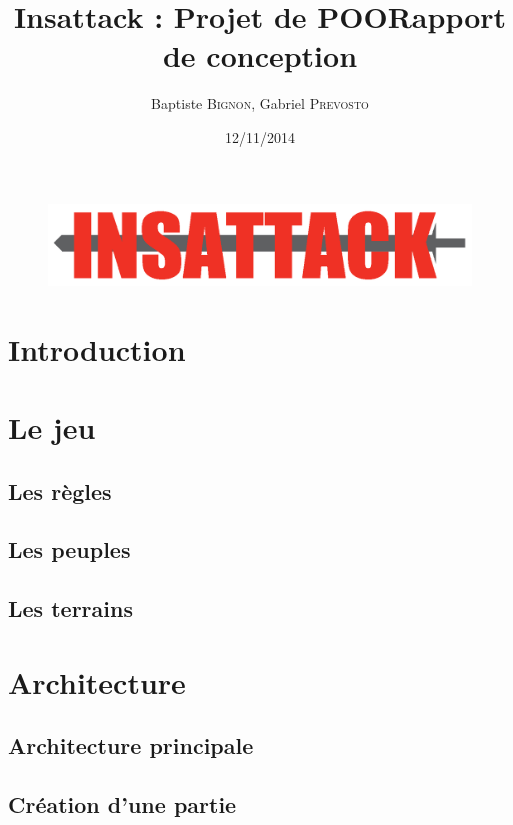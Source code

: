 \documentclass[12pt]{article}
\title{Insattack : Projet de POO\smallbreak Rapport de conception}
\author{Baptiste \textsc{Bignon}, Gabriel \textsc{Prevosto}}
\date{12/11/2014}
\begin{document}
\maketitle

\begin{figure}[!h]
\centering
\includegraphics[width=\textwidth]{Parties/Images/Logo}
\label{fig:logo}
\end{figure}

\newpage

\tableofcontents
\renewcommand{\contentsname}{Sommaire}
\newpage


\section{Introduction}			\label{sec:introduction}
\newpage

\section{Le jeu}				\label{sec:jeu}
\subsection{Les règles}			\label{sec:regles}
\subsection{Les peuples}			\label{peuples}
\subsection{Les terrains}			\label{terrains}
\newpage

\section{Architecture}			\label{sec:archi}
\subsection{Architecture principale}	\label{sec:architecturePrincipale}
\subsection{Création d'une partie}	\label{sec:creationPartie}
\end{document}
